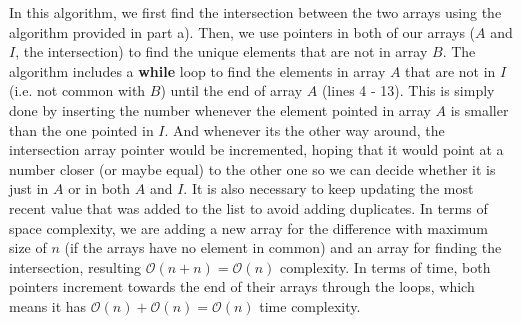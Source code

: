     In this algorithm, we first find the intersection between the two arrays using the algorithm provided in part a). Then, we use pointers in both of our 
    arrays ($A$ and $I$, the intersection) to find the unique elements that are not in array $B$.
    The algorithm includes a \textbf{while} loop to find the elements in array $A$ that are not in $I$ (i.e. not common with $B$) until the end of array $A$ (lines 4 - 13).
    This is simply done by inserting the number whenever the element pointed in array $A$ is smaller than the one pointed in $I$.
    And whenever its the other way around, the intersection array pointer would be incremented, hoping that it 
    would point at a number closer (or maybe equal) to the other one so we can decide whether it is just in $A$ or in both $A$ and $I$. It is also necessary to keep updating the most recent value
    that was added to the list to avoid adding duplicates. In terms of space complexity, we are adding a new array 
    for the difference with maximum size of $n$ (if the arrays have no element in common) and an array for finding the intersection, resulting $\mathcal{O}(n+n)=\mathcal{O}(n)$ complexity. In terms of time, both pointers
    increment towards the end of their arrays through the loops, which means it has $\mathcal{O}(n)+\mathcal{O}(n)=\mathcal{O}(n)$ time complexity. 
    
